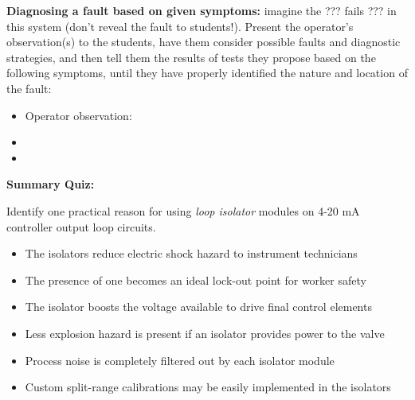 \vskip 10pt


\noindent
{\bf Diagnosing a fault based on given symptoms:} imagine the ??? fails ??? in this system (don't reveal the fault to students!).  Present the operator's observation(s) to the students, have them consider possible faults and diagnostic strategies, and then tell them the results of tests they propose based on the following symptoms, until they have properly identified the nature and location of the fault:

\begin{itemize}
\item{} Operator observation: {\it }
\item{} 
\item{} 
\end{itemize}















\vfil \eject

\noindent
{\bf Summary Quiz:}

Identify one practical reason for using {\it loop isolator} modules on 4-20 mA controller output loop circuits.

\begin{itemize}
\item{} The isolators reduce electric shock hazard to instrument technicians
\vskip 5pt 
\item{} The presence of one becomes an ideal lock-out point for worker safety
\vskip 5pt 
\item{} The isolator boosts the voltage available to drive final control elements
\vskip 5pt 
\item{} Less explosion hazard is present if an isolator provides power to the valve
\vskip 5pt 
\item{} Process noise is completely filtered out by each isolator module
\vskip 5pt 
\item{} Custom split-range calibrations may be easily implemented in the isolators
\end{itemize}





